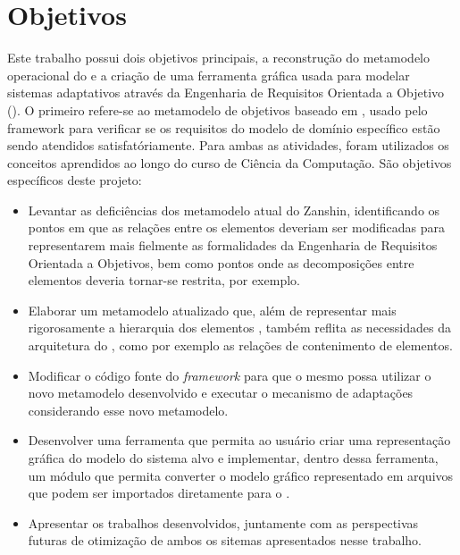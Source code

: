 \section{Objetivos}
\label{sec-intro-objetivos}

Este trabalho possui dois objetivos principais, a reconstrução do metamodelo operacional do \zanshin e a criação de uma ferramenta gráfica usada para modelar sistemas adaptativos através da Engenharia de Requisitos Orientada a Objetivo (\gore). O primeiro refere-se ao metamodelo de objetivos baseado em \istar, usado pelo framework para verificar se os requisitos do modelo de domínio específico estão sendo atendidos satisfatóriamente. Para ambas as atividades, foram utilizados os conceitos aprendidos ao longo do curso de Ciência da Computação. São objetivos específicos deste projeto:

\begin{itemize}
	
	\item Levantar as deficiências dos metamodelo atual do Zanshin, identificando os pontos em que as relações entre os elementos deveriam ser modificadas para representarem mais fielmente as formalidades da Engenharia de Requisitos Orientada a Objetivos, bem como pontos onde as decomposições entre elementos deveria tornar-se restrita, por exemplo. 
	
	\item Elaborar um metamodelo atualizado que, além de representar mais rigorosamente a hierarquia dos elementos \gore, também reflita as necessidades da arquitetura do \zanshin, como por exemplo as relações de contenimento de elementos.
	
	\item Modificar o código fonte do \textit{framework} para que o mesmo possa utilizar o novo metamodelo desenvolvido e executar o mecanismo de adaptações considerando esse novo metamodelo.
	
	\item Desenvolver uma ferramenta que permita ao usuário criar uma representação gráfica do modelo do sistema alvo e implementar, dentro dessa ferramenta, um módulo que permita converter o modelo gráfico representado em arquivos \xml que podem ser importados diretamente para o \zanshin.
	
	\item Apresentar os trabalhos desenvolvidos, juntamente com as perspectivas futuras de otimização de ambos os sitemas apresentados nesse trabalho.

\end{itemize}


